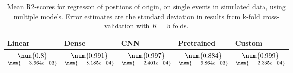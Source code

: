 \begin{table}
\centering
\caption{
Mean R2-scores for regresson of positions of origin, on single events in simulated data, using multiple models. 
Error estimates are the standard deviation in results from k-fold cross-validation 
with $K=5$ folds.
}
\label{tab:regression-simulated-single-position-r2}
\begin{tabular}{lllll}
\toprule
                                           Linear &                                               Dense &                                                 CNN &                                          Pretrained &                                              Custom \\
\midrule
 $\underset{\num{+- 3.664e-03 }  }{\num{ 0.8 } }$ &  $\underset{\num{+- 8.185e-04 }  }{\num{ 0.991 } }$ &  $\underset{\num{+- 2.401e-04 }  }{\num{ 0.997 } }$ &  $\underset{\num{+- 6.864e-03 }  }{\num{ 0.884 } }$ &  $\underset{\num{+- 2.335e-04 }  }{\num{ 0.999 } }$ \\
\bottomrule
\end{tabular}
\end{table}
